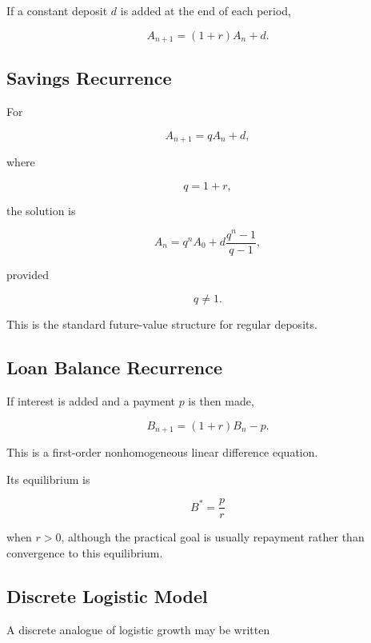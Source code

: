 If a constant deposit \(d\) is added at the end of each period,

\[
\boxed{
A_{n+1}
=
(1+r)A_n+d.
}
\]

\subsection{Savings Recurrence}
\label{subsec:savings-recurrence}

For

\[
A_{n+1}
=
qA_n+d,
\]

where

\[
q=1+r,
\]

the solution is

\[
\boxed{
A_n
=
q^nA_0
+
d
\frac{
q^n-1
}{
q-1
},
}
\]

provided

\[
q\neq1.
\]

This is the standard future-value structure for regular deposits.

\subsection{Loan Balance Recurrence}
\label{subsec:loan-balance-recurrence}

If interest is added and a payment \(p\) is then made,

\[
\boxed{
B_{n+1}
=
(1+r)B_n-p.
}
\]

This is a first-order nonhomogeneous linear difference equation.

Its equilibrium is

\[
\boxed{
B^*
=
\frac{p}{r}
}
\]

when \(r>0\), although the practical goal is usually repayment rather
than convergence to this equilibrium.

\subsection{Discrete Logistic Model}
\label{subsec:discrete-logistic-model}

A discrete analogue of logistic growth may be written

